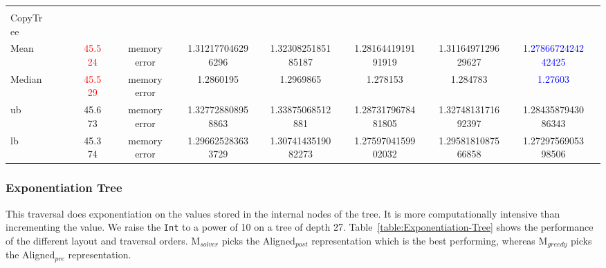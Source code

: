 \documentclass[acmsmall,review,anonymous]{acmart}\settopmatter{printfolios=true,printccs=false,printacmref=false}
\newcommand{\systemSolver}{{\sc M$_{\mathit{solver}}$}\xspace}
\newcommand{\systemGreedy}{{\sc M$_{\mathit{greedy}}$}\xspace}
\newcommand{\alignedPre}{{\sc Aligned$_{\mathit{pre}}$}\xspace}
\newcommand{\alignedPost}{{\sc Aligned$_{\mathit{post}}$}\xspace}
\newcommand{\snumfour}[1]{{\num[round-precision=4,round-mode=figures,scientific-notation=true,output-exponent-marker = e]{#1}}}
\begin{document}
\begin{table}[]
\begin{tabular}{@{}p{0.6in}rcrcrcrcrcrcrcrcr@{}}
                   \\
      \\
    Copy\:Tree\\
    Mean
             &
             &
             &&    \textcolor{red}{{45.524}}
             &&    memory error
             &&   \snumfour{1.312177046296296}
             &&   \snumfour{1.3230825185185187}
             &&   \snumfour{1.2816441919191919}
             &&   \snumfour{1.3116497129629627}
             &&   \textcolor{blue}{\snumfour{1.2786672424242425}}
            \\
    Median
             &
             &
             &&    \textcolor{red}{{45.529}}
             &&    memory error
            &&   \snumfour{1.2860195}
            &&   \snumfour{1.2969865}
            &&   \snumfour{1.278153}
            &&   \snumfour{1.284783}
            &&   \textcolor{blue}{\snumfour{1.27603}}
            \\
    ub
                    &
                    &
                    &&    {45.673}
                    &&    memory error
                   &&    \snumfour{1.327728808958863}
                   &&    \snumfour{1.33875068512881}
                   &&    \snumfour{1.2873179678481805}
                   &&    \snumfour{1.3274813171692397}
                   &&    \snumfour{1.2843587943086343}
                   \\
    lb
                    &
                    &
                    &&    {45.374}
                    &&    memory error
                   &&    \snumfour{1.296625283633729}
                   &&    \snumfour{1.3074143519082273}
                   &&    \snumfour{1.2759704159902032}
                   &&    \snumfour{1.2958181087566858}
                   &&    \snumfour{1.2729756905398506}
                   \\
    \bottomrule
    \end{tabular}
    \label{table:Add-one-Tree}
    \label{table:Exponentiation-Tree}
	\label{table:Copy-Tree}
\end{table} 
\subsubsection{Exponentiation Tree}

This traversal does exponentiation on the values stored in the internal nodes of the tree. It is more computationally intensive than incrementing the value.
We raise the \lstinline|Int| to a power of 10 on a tree of depth 27. Table~\ref{table:Exponentiation-Tree} shows the performance of the different layout and traversal orders.
\systemSolver picks the \alignedPost representation which is the best performing, whereas \systemGreedy picks the \alignedPre representation. 
\end{document}
